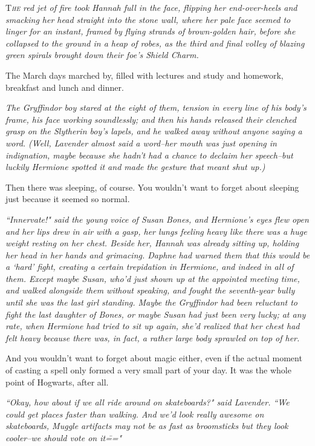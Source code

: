 
\lettrine{T}{\emph{he}} \emph{red jet of fire took Hannah full in the face, flipping her end-over-heels and smacking her head straight into the stone wall, where her pale face seemed to linger for an instant, framed by flying strands of brown-golden hair, before she collapsed to the ground in a heap of robes, as the third and final volley of blazing green spirals brought down their foe's Shield Charm.}

The March days marched by, filled with lectures and study and homework, breakfast and lunch and dinner.

\emph{The Gryffindor boy stared at the eight of them, tension in every line of his body's frame, his face working soundlessly; and then his hands released their clenched grasp on the Slytherin boy's lapels, and he walked away without anyone saying a word. (Well, Lavender almost said a word\---her mouth was just opening in indignation, maybe because she hadn't had a chance to declaim her speech\---but luckily Hermione spotted it and made the gesture that meant \emph{shut up}.)}

Then there was sleeping, of course. You wouldn't want to forget about sleeping just because it seemed so normal.

\emph{``Innervate!" said the young voice of Susan Bones, and Hermione's eyes flew open and her lips drew in air with a gasp, her lungs feeling heavy like there was a huge weight resting on her chest. Beside her, Hannah was already sitting up, holding her head in her hands and grimacing. Daphne had warned them that this would be a `hard' fight, creating a certain trepidation in Hermione, and indeed in all of them. Except maybe Susan, who'd just shown up at the appointed meeting time, and walked alongside them without speaking, and fought the seventh-year bully until she was the last girl standing. Maybe the Gryffindor had been reluctant to fight the last daughter of Bones, or maybe Susan had just been very lucky; at any rate, when Hermione had tried to sit up again, she'd realized that her chest had felt heavy because there was, in fact, a rather large body sprawled on top of her.}

And you wouldn't want to forget about magic either, even if the actual moment of casting a spell only formed a very small part of your day. It was the whole point of Hogwarts, after all.

\emph{``Okay, how about if we all ride around on skateboards?" said Lavender. ``We could get places faster than walking. And we'd look really awesome on skateboards, Muggle artifacts may not be as fast as broomsticks but they look cooler\---we should vote on it\==="}

